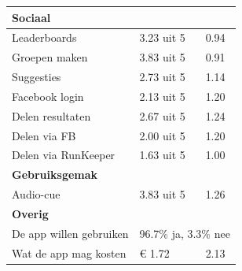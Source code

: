 \begin{table}[h]
\begin{tabular}{| l | l | l |}
\multicolumn{3}{l}{\textbf{Sociaal}}                                                                                   \\ \hline
Leaderboards             & 3.23 uit 5                                     & 0.94                                         \\ \hline
Groepen maken            & 3.83 uit 5                                     & 0.91                                         \\ \hline
Suggesties               & 2.73 uit 5                                     & 1.14                                         \\ \hline
Facebook login           & 2.13 uit 5                                     & 1.20                                         \\ \hline
Delen resultaten         & 2.67 uit 5                                     & 1.24                                         \\ \hline
Delen via FB             & 2.00 uit 5                                     & 1.20                                         \\ \hline
Delen via RunKeeper      & 1.63 uit 5                                     & 1.00                                         \\ \hline
\multicolumn{3}{l}{\textbf{Gebruiksgemak}}                                                                             \\ \hline
Audio-cue                & 3.83 uit 5                                     & 1.26                                         \\ \hline
\multicolumn{3}{l}{\textbf{Overig}}                                                                                    \\ \hline
De app willen gebruiken  & \multicolumn{2}{l|}{96.7\% ja, 3.3\% nee}                                                     \\ \hline
Wat de app mag kosten    & € 1.72                                         & 2.13                                         \\ \hline               
\end{tabular}
\end{table}

\newpage

